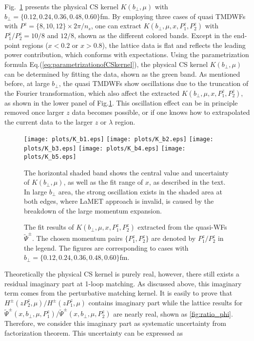 \documentclass[prd,aps,twocolumn,preprintnumbers, showpacs, nofootinbib,superscriptaddress,notitlepage]{revtex4-1}
\begin{document}
Fig.~\ref{fig:K_b} presents the physical CS kernel $K(b_{\perp},\mu)$ with $b_{\perp}=\{0.12,0.24,0.36,0.48,0.60\}$fm. By employing three cases of quasi TMDWFs with $P^z=\{8,10,12\}\times2\pi/n_s$, one can extract $K(b_{\perp},\mu,x,P^z_1,P^z_2)$ with $P_1^z/P_2^z=10/8$ and $12/8$, shown as the different colored bands.  Except in the end-point regions ($x<0.2$ or $x>0.8$), the lattice data is flat and reflects the leading power contribution, which conforms with expectations. Using the parametrization formula Eq.(\ref{eq:parametrizationofCSkernel}), the physical CS kernel $K(b_{\perp},\mu)$ can be determined by fitting the data, shown as the green band. As mentioned before, at large $b_{\perp}$, the quasi TMDWFs   show oscillations due to the  truncation of the Fourier transformation, which also affect the extracted $K(b_{\perp},\mu,x,P^z_1,P^z_2)$, as shown in the lower panel of Fig.\ref{fig:K_b}. This oscillation effect can be in principle removed once larger $z$ data becomes possible, or if one knows how to extrapolated the current data to the larger $z$ or $\lambda$ region. 

\begin{widetext}

\begin{figure}
\centering
    \texttt{[image: plots/K\_b1.eps]}
    \texttt{[image: plots/K\_b2.eps]}
    \texttt{[image: plots/K\_b3.eps]}
    \texttt{[image: plots/K\_b4.eps]}
    \texttt{[image: plots/K\_b5.eps]}
\caption{The fit results of $K(b_{\perp},\mu,x,P^z_1,P^z_2)$ extracted from the quasi-WFs $\tilde{\Psi}^{\pm}$. The chosen momentum pairs $\{P_1^z,P^z_2\}$ are denoted by $P^z_1/P_2^z$ in the legend. The figures are corresponding to cases with $b_{\perp}=\{0.12,0.24,0.36,0.48,0.60\}$fm.} The horizontal shaded band shows the central value and uncertainty of $K(b_{\perp},\mu)$, as well as the fit range of $x$, as described in the text. In large $b_{\perp}$ area, the strong oscillation exists in the shaded area at both edges, where LaMET approach is invalid, is caused by the breakdown of the large momentum expansion.
    \label{fig:K_b}
\end{figure}

\end{widetext}

Theoretically the physical CS kernel is purely real, however, there still exists a residual imaginary part at 1-loop matching. As discussed above, this imaginary term comes from the perturbative matching kernel. It is easily to prove that $H^{\pm}(zP_2^z,\mu)/H^{\pm}(zP_1^z,\mu)$ contains imaginary part while the lattice results for $\tilde{\Psi}^{\pm}(x,b_{\perp},\mu,P_1^z)/\tilde{\Psi}^{\pm}(x,b_{\perp},\mu,P_2^z)$ are nearly real, shown as \ref{fig:ratio_phi}. Therefore, we consider this imaginary part as systematic uncertainty from factorization theorem. This uncertainty can be expressed as
\end{document}
